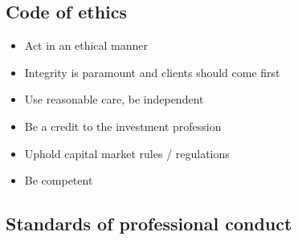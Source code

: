 \documentclass[../notes_compiled.tex]{subfiles}
\begin{document}
\subsection{Code of ethics}
\begin{itemize}
\item Act in an ethical manner
\item Integrity is paramount and clients should come first
\item Use reasonable care, be independent
\item Be a credit to the investment profession
\item Uphold capital market rules / regulations
\item Be competent
\end{itemize}

\subsection{Standards of professional conduct}
\end{document}
